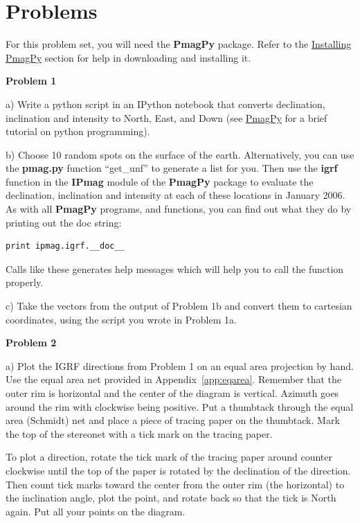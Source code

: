 \vskip 24pt
{\parindent 0pt \parskip 12pt 
\section{Problems}
 
For this problem set, you will need the {\bf PmagPy}  package.  Refer to the \href{http://earthref.org/PmagPy/cookbook#http://earthref.org/PmagPy/cookbook/#quick_start}{Installing PmagPy} section for help in downloading and installing it.  




{\bf Problem 1}


a) Write a python script in an IPython notebook
that converts
declination, inclination and intensity to North, East, and Down (see \href{http://earthref.org/PmagPy/cookbook/#Python}{PmagPy} for a brief tutorial on python programming).  


b) Choose 10 random spots on the surface of the earth.  Alternatively, you can use the {\bf pmag.py} function ``get\_unf'' to generate a list for you.  Then 
use the {\bf igrf} function  in the {\bf IPmag} module of the   {\bf PmagPy}  package to  evaluate  the declination, inclination and intensity at each of these locations in January 2006.  As with all {\bf PmagPy} programs, and functions, you can find out what they do by printing out the doc string:

\begin{verbatim}
print ipmag.igrf.__doc__
\end{verbatim}

\noindent  Calls like these generates  help messages which will help you to call the function properly.  



c) Take the vectors from the output of  Problem 1b and convert them to cartesian coordinates, using the  script you wrote in Problem 1a.  


{\bf Problem 2}

a) Plot the IGRF directions from Problem 1  on an equal area projection by hand.    Use the equal area net provided in Appendix~\ref{app:eqarea}.   Remember that the outer rim is  horizontal and the center of the diagram is vertical.  Azimuth goes around the rim with clockwise being positive.    Put a  thumbtack through the equal area (Schmidt) net and place a piece of tracing paper on the thumbtack. Mark the top of the stereonet with a tick mark on the tracing paper. 

To plot a direction,   rotate the tick mark of the tracing paper around  counter clockwise until the top of the paper is rotated by the declination of the direction. Then count tick marks toward the center from the outer rim (the horizontal) to the inclination angle, plot the point, and rotate back so that the tick is North again. Put all your points on the diagram.


}
